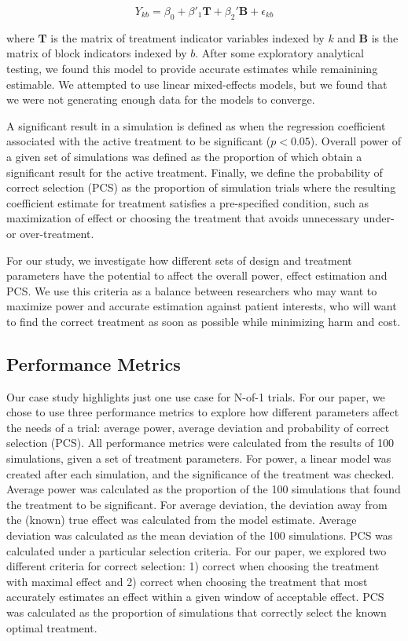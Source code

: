 \documentclass[11pt,]{article}
\begin{document}
\[
Y_{kb} = \beta_0 + \beta'_1 \mathbf{T} +\beta_2'\mathbf{B} + \epsilon_{kb}
\]

where \(\mathbf{T}\) is the matrix of treatment indicator variables
indexed by \(k\) and \(\mathbf{B}\) is the matrix of block indicators
indexed by \(b\). After some exploratory analytical testing, we found
this model to provide accurate estimates while remainining estimable. We
attempted to use linear mixed-effects models, but we found that we were
not generating enough data for the models to converge.

A significant result in a simulation is defined as when the regression
coefficient associated with the active treatment to be significant
(\(p < 0.05\)). Overall power of a given set of simulations was defined
as the proportion of which obtain a significant result for the active
treatment. Finally, we define the probability of correct selection (PCS)
as the proportion of simulation trials where the resulting coefficient
estimate for treatment satisfies a pre-specified condition, such as
maximization of effect or choosing the treatment that avoids unnecessary
under- or over-treatment.

For our study, we investigate how different sets of design and treatment
parameters have the potential to affect the overall power, effect
estimation and PCS. We use this criteria as a balance between
researchers who may want to maximize power and accurate estimation
against patient interests, who will want to find the correct treatment
as soon as possible while minimizing harm and cost.

\subsection{Performance Metrics}\label{performance-metrics}

Our case study highlights just one use case for N-of-1 trials. For our
paper, we chose to use three performance metrics to explore how
different parameters affect the needs of a trial: average power, average
deviation and probability of correct selection (PCS). All performance
metrics were calculated from the results of 100 simulations, given a set
of treatment parameters. For power, a linear model was created after
each simulation, and the significance of the treatment was checked.
Average power was calculated as the proportion of the 100 simulations
that found the treatment to be significant. For average deviation, the
deviation away from the (known) true effect was calculated from the
model estimate. Average deviation was calculated as the mean deviation
of the 100 simulations. PCS was calculated under a particular selection
criteria. For our paper, we explored two different criteria for correct
selection: 1) correct when choosing the treatment with maximal effect
and 2) correct when choosing the treatment that most accurately
estimates an effect within a given window of acceptable effect. PCS was
calculated as the proportion of simulations that correctly select the
known optimal treatment.
\end{document}
